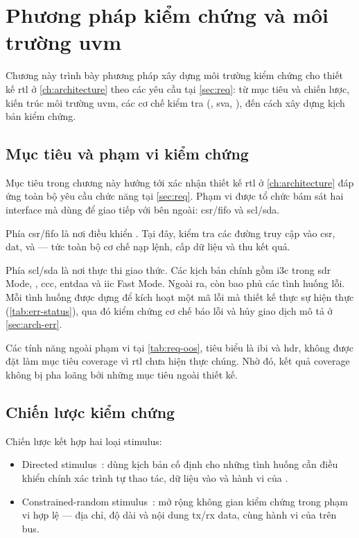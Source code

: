 \chapter{Phương pháp kiểm chứng và môi trường \texorpdfstring{\gls{uvm}}{UVM}}
\label{ch:verification}

Chương này trình bày phương pháp xây dựng môi trường kiểm chứng cho thiết kế \gls{rtl} ở
\cref{ch:architecture} theo các yêu cầu tại \cref{sec:req}: từ mục tiêu và chiến lược, kiến
trúc môi trường \gls{uvm}, các cơ chế kiểm tra (\Scoreboard{}, \gls{sva}, \FunctionalCoverage{}), đến
cách xây dựng kịch bản kiểm chứng.

\section{Mục tiêu và phạm vi kiểm chứng}
\label{sec:ver-scope}

Mục tiêu trong chương này hướng tới xác nhận thiết kế \gls{rtl} ở \cref{ch:architecture} đáp ứng
toàn bộ yêu cầu chức năng tại \cref{sec:req}. Phạm vi được tổ chức bám sát hai interface
mà \Controller{} dùng để giao tiếp với bên ngoài: \gls{csr}/\gls{fifo} và \gls{scl}/\gls{sda}.

Phía \gls{csr}/\gls{fifo} là nơi \Host{} điều khiển \Controller{}. Tại đây, \Testbench{} kiểm tra các đường
truy cập vào \gls{csr}, \gls{dat}, \CommandResponseFifo{} và \TxRxFifo{} --- tức toàn bộ cơ chế nạp lệnh,
cấp dữ liệu và thu kết quả.

Phía \gls{scl}/\gls{sda} là nơi \Controller{} thực thi giao thức. Các kịch bản chính gồm \gls{i3c}
\PrivateTransfer{} trong \gls{sdr} Mode, \ImmediateDataTransfer{}, \gls{ccc}, \gls{entdaa} và
\gls{iic} Fast Mode. Ngoài ra, \Testbench{} còn bao phủ các tình huống lỗi. Mỗi tình huống được dựng để kích
hoạt một mã lỗi mà thiết kế thực sự hiện thực (\cref{tab:err-status}), qua
đó kiểm chứng cơ chế báo lỗi và hủy giao dịch mô tả ở \cref{sec:arch-err}.

Các tính năng ngoài phạm vi tại \cref{tab:req-oos}, tiêu biểu là \gls{ibi} và \gls{hdr}, không được đặt
làm mục tiêu coverage vì \gls{rtl} chưa hiện thực chúng. Nhờ đó, kết quả coverage không bị pha loãng bởi
những mục tiêu ngoài thiết kế.

\section{Chiến lược kiểm chứng}
\label{sec:ver-strategy}

Chiến lược kết hợp hai loại stimulus:
\begin{itemize}
	\item Directed stimulus~\cite{uvm12_ug}: dùng kịch bản cố định cho những tình huống cần điều khiển
	      chính xác trình tự thao tác, dữ liệu vào và hành vi của \Target{}.
	\item Constrained-random stimulus~\cite{uvm12_ug}: mở rộng không gian kiểm chứng trong phạm vi hợp
	      lệ --- địa chỉ, độ dài và nội dung \gls{tx}/\gls{rx} data, cùng hành vi của \Target{} trên bus.
\end{itemize}

